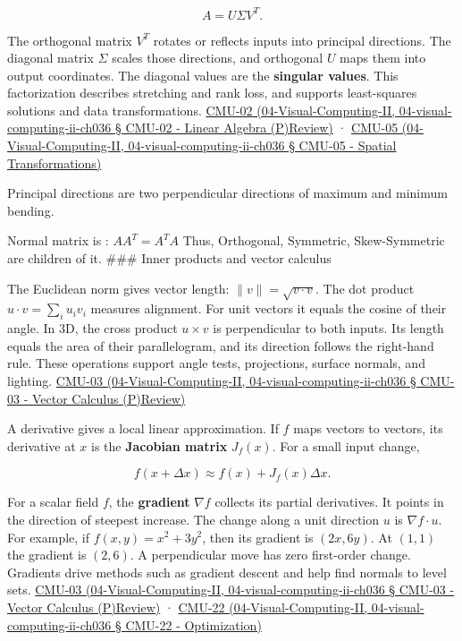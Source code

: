 \[
A=U\Sigma V^T.
\]

The orthogonal matrix \(V^T\) rotates or reflects inputs into principal directions. The diagonal matrix \(\Sigma\) scales those directions, and orthogonal \(U\) maps them into output coordinates. The diagonal values are the \textbf{singular values}. This factorization describes stretching and rank loss, and supports least-squares solutions and data transformations. \href{}{CMU-02 (04-Visual-Computing-II, 04-visual-computing-ii-ch036 § CMU-02 - Linear Algebra (P)Review)} · \href{}{CMU-05 (04-Visual-Computing-II, 04-visual-computing-ii-ch036 § CMU-05 - Spatial Transformations)}

Principal directions are two perpendicular directions of maximum and minimum bending.

Normal matrix is : \(AA^T = A^T A\) Thus, Orthogonal, Symmetric, Skew-Symmetric are children of it. \#\#\# Inner products and vector calculus

The Euclidean norm gives vector length: \(\|v\|=\sqrt{v\cdot v}\). The dot product \(u\cdot v=\sum_i u_iv_i\) measures alignment. For unit vectors it equals the cosine of their angle. In 3D, the cross product \(u\times v\) is perpendicular to both inputs. Its length equals the area of their parallelogram, and its direction follows the right-hand rule. These operations support angle tests, projections, surface normals, and lighting. \href{}{CMU-03 (04-Visual-Computing-II, 04-visual-computing-ii-ch036 § CMU-03 - Vector Calculus (P)Review)}

A derivative gives a local linear approximation. If \(f\) maps vectors to vectors, its derivative at \(x\) is the \textbf{Jacobian matrix} \(J_f(x)\). For a small input change,

\[
f(x+\Delta x)\approx f(x)+J_f(x)\Delta x.
\]

For a scalar field \(f\), the \textbf{gradient} \(\nabla f\) collects its partial derivatives. It points in the direction of steepest increase. The change along a unit direction \(u\) is \(\nabla f\cdot u\). For example, if \(f(x,y)=x^2+3y^2\), then its gradient is \((2x,6y)\). At \((1,1)\) the gradient is \((2,6)\). A perpendicular move has zero first-order change. Gradients drive methods such as gradient descent and help find normals to level sets. \href{}{CMU-03 (04-Visual-Computing-II, 04-visual-computing-ii-ch036 § CMU-03 - Vector Calculus (P)Review)} · \href{}{CMU-22 (04-Visual-Computing-II, 04-visual-computing-ii-ch036 § CMU-22 - Optimization)}

